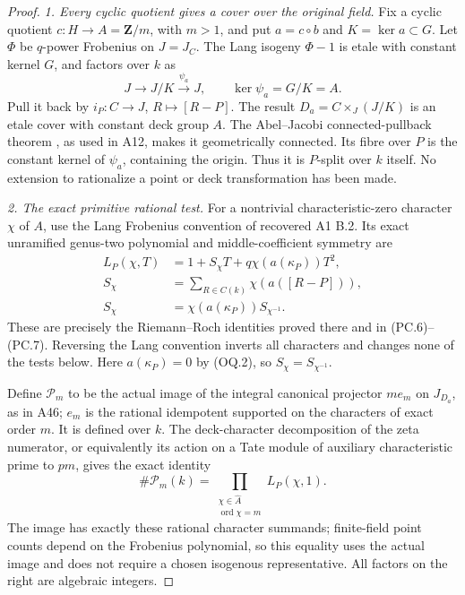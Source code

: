 \documentclass[11pt,a4paper]{article}
\begin{document}
\begin{proof}
\emph{1. Every cyclic quotient gives a cover over the original field.}
Fix a cyclic quotient $c:H\to A=\mathbf Z/m$, with $m>1$, and put
$a=c\circ b$ and $K=\ker a\subset G$.
Let $\Phi$ be $q$-power Frobenius on $J=J_C$. The Lang isogeny
$\Phi-1$ is etale with constant kernel $G$, and factors over $k$ as
\[
             J\longrightarrow J/K\xrightarrow{\psi_a}J,
                    \qquad \ker\psi_a=G/K=A.
 \tag{OQ.6}
\]
Pull it back by $i_P:C\to J$, $R\mapsto[R-P]$.
The result $D_a=C\times_J(J/K)$ is an etale cover with constant
deck group $A$. The Abel--Jacobi connected-pullback theorem
\cite[Proposition~9.1]{MilneJV}, as used in A12, makes it
geometrically connected. Its fibre over $P$ is the constant kernel
of $\psi_a$, containing the origin. Thus it is $P$-split over $k$
itself. No extension to rationalize a point or deck transformation
has been made.

\emph{2. The exact primitive rational test.}
For a nontrivial characteristic-zero character $\chi$ of $A$, use
the Lang Frobenius convention of recovered A1 B.2. Its exact
unramified genus-two polynomial and middle-coefficient symmetry are
\[
\begin{aligned}
 L_P(\chi,T)&=1+S_\chi T+q\chi(a(\kappa_P))T^2,\\
 S_\chi&=\sum_{R\in C(k)}\chi(a([R-P])),\\
 S_\chi&=\chi(a(\kappa_P))S_{\chi^{-1}}.
\end{aligned}
 \tag{OQ.7}
\]
These are precisely the Riemann--Roch identities proved there
and in (PC.6)--(PC.7). Reversing the Lang convention inverts all
characters and changes none of the tests below. Here
$a(\kappa_P)=0$ by (OQ.2), so $S_\chi=S_{\chi^{-1}}$.

Define $\mathcal P_m$ to be the actual image of the integral
canonical projector $m e_m$ on $J_{D_a}$, as in A46; $e_m$ is
the rational idempotent supported on the characters of exact
order $m$. It is defined over $k$. The deck-character decomposition
of the zeta numerator, or equivalently its action on a Tate module
of auxiliary characteristic prime to $pm$, gives the exact identity
\[
       \#\mathcal P_m(k)
       =\prod_{\substack{\chi\in\widehat A\\\operatorname{ord}\chi=m}}
                         L_P(\chi,1).
 \tag{OQ.8}
\]
The image has exactly these rational character summands; finite-field
point counts depend on the Frobenius polynomial, so this equality
uses the actual image and does not require a chosen isogenous
representative. All factors on the right are algebraic integers.


\end{proof}
\end{document}
